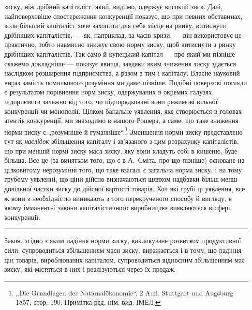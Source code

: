 \parcont{}  %
зиску, ніж дрібний капіталіст, який, видимо, одержує високий зиск. Далі, найповерховіше
спостереження конкуренції показує, що при певних обставинах, коли більший капіталіст хоче захопити
для себе місце на ринку, витиснути дрібніших капіталістів, — як, наприклад, за часів кризи, — він
використовує це практично, тобто навмисно знижує свою норму зиску, щоб витиснути з ринку дрібніших
капіталістів. Так само й купецький капітал — про який ми пізніше скажемо докладніше — показує явища,
завдяки яким зниження зиску здається наслідком розширення підприємства, а разом з тим і капіталу.
Власне науковий вираз замість помилкового розуміння ми дамо пізніше. Подібні поверхові погляди є
результатом порівнення норм зиску, одержуваних в окремих галузях підприємств залежно від того, чи
підпорядковані вони режимові вільної конкуренції чи монополії. Цілком банальне уявлення, яке
створюється в головах агентів конкуренції, ми знаходимо в нашого Рошера, а саме, що таке зниження
норми зиску є „розумніше й гуманніше“.\footnote*{
„Die Grundlagen der Nationalökonomie“. 2 Aufl. Stuttgart und Augsburg 1857,
стор. 190. Примітка ред. нім. вид. ІМЕЛ.
} Зменшення норми зиску представлено тут як \emph{наслідок}
збільшення капіталу і зв’язаного з цим розрахунку капіталістів, що при меншій нормі зиску маса
зиску, яку вони кладуть собі в кишеню, буде більша. Все це (за винятком того, що є в А.~Сміта, про
що пізніше) основане на цілковитому нерозумінні того, що таке взагалі є загальна норма зиску, і на
тому грубому уявленні, що ціни дійсно визначаються шляхом надбавки більш-менш довільної частки зиску
до дійсної вартості товарів. Хоч які грубі ці уявлення, все ж вони з необхідністю виникають з того
перекрученого способу й вигляду, в якому імманентні закони капіталістичного виробництва виявляються
в сфері конкуренції.

\pfbreak{}

Закон, згідно з яким падіння норми зиску, викликуване розвитком продуктивної сили, супроводиться
збільшенням маси зиску, виражається і в тому, що падіння цін товарів, вироблюваних капіталом,
супроводиться відносним збільшенням мас зиску, які містяться в них і реалізуються через їх продаж.

